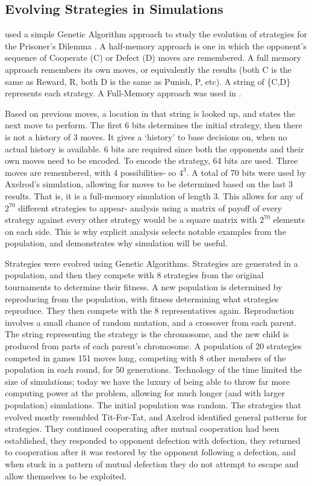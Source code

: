 \documentclass[a4paper,11pt,bcshonoursthesis,singlespace,twoside,thesisdraft,pdflatex]{cssethesis}
\begin{document}
\subsection{Evolving Strategies in Simulations}
\label{sec:axelrodEvolving}
\citet{axelrod1987evolution} used a simple Genetic Algorithm approach to study the evolution of strategies for the Prisoner's Dilemma \citep{back1997handbook}. A half-memory approach is one in which the opponent's sequence of Cooperate (C) or Defect (D) moves are remembered. A full memory approach remembers its own moves, or equivalently the results (both C is the same as Reward, R, both D is the same as Punish, P, etc). A string of \{C,D\} represents each strategy. A Full-Memory approach was used in \citet{axelrod1987evolution}. 

Based on previous moves, a location in that string is looked up, and states the next move to perform. 
The first 6 bits determines the initial strategy, then there is not a history of 3 moves. 
It gives a `history' to base decisions on, when no actual history is available. 
6 bits are required since both the opponents and their own moves need to be encoded. 
To encode the strategy, 64 bits are used. Three moves are remembered, with 4 possibilities- so $4^3$. 
A total of 70 bits were used by Axelrod's simulation, allowing for moves to be determined based on the last 3 results. That is, it is a full-memory simulation of length 3. 
This allows for any of $2^{70}$ different strategies to appear- analysis using a matrix of payoff of every strategy against every other strategy would be a square matrix with $2^{70}$ elements on each side. 
This is why explicit analysis selects notable examples from the population, and demonstrates why simulation will be useful. 

Strategies were evolved using Genetic Algorithms. Strategies are generated in a population, and then they compete with 8 strategies from the original tournaments to determine their fitness. A new population is determined by reproducing from the population, with fitness determining what strategies reproduce. They then compete with the 8 representatives again. 
Reproduction involves a small chance of random mutation, and a crossover from each parent. 
The string representing the strategy is the chromosome, and the new child is produced from parts of each parent's chromosome. A population of 20 strategies competed in games 151 moves long, competing with 8 other members of the population in each round, for 50 generations. 
Technology of the time limited the size of simulations; today we have the luxury of being able to throw far more computing power at the problem, allowing for much longer (and with larger population) simulations. 
The initial population was random. The strategies that evolved mostly resembled Tit-For-Tat, and Axelrod identified general patterns for strategies. They continued cooperating after mutual cooperation had been established, they responded to opponent defection with defection, they returned to cooperation after it was restored by the opponent following a defection, and when stuck in a pattern of mutual defection they do not attempt to escape and allow themselves to be exploited. 
\end{document}
